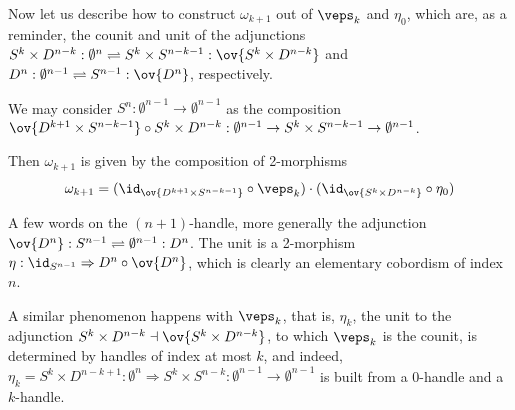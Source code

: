 \documentclass[12pt]{article}
\newcommand{\disk}[1]{{D^{#1}}}
\newcommand{\sphr}[1]{{S^{#1}}}
\newcommand{\empt}[1]{{\emptyset^{#1}}}
\begin{document}
Now let us describe how to construct $\omega_{k+1}$
out of $\veps_k$ and $\eta_0$,
which are, as a reminder,
the counit and unit of the adjunctions
$\sphr{k} \times \disk{n-k} : \empt{n} \rightleftharpoons
	\sphr{k} \times \sphr{n-k-1} : \ov{\sphr{k} \times \disk{n-k}}$
and
$\disk{n} : \empt{n-1} \rightleftharpoons
	\sphr{n-1}: \ov{\disk{n}}$,
respectively.

We may consider $\sphr{n}: \empt{n-1} \to \empt{n-1}$
as the composition $\ov{\disk{k+1} \times \sphr{n-k-1}}
\circ \sphr{k} \times \disk{n-k} :
\empt{n-1} \to \sphr{k} \times \sphr{n-k-1} \to \empt{n-1}$.

Then $\omega_{k+1}$ is given by the composition of 2-morphisms
\[
\omega_{k+1} = (\id_{\ov{\disk{k+1} \times \sphr{n-k-1}}}
		\circ \veps_k)
	\cdot (\id_{\ov{\sphr{k} \times \disk{n-k}}} \circ \eta_0)
\]



A few words on the $(n+1)$-handle,
more generally the adjunction
$\ov{\disk{n}} : \sphr{n-1} \rightleftharpoons
	\empt{n-1}: \disk{n}$.
The unit is a 2-morphism
$\eta: \id_{\sphr{n-1}} \Rightarrow \disk{n} \circ \ov{\disk{n}}$,
which is clearly an elementary cobordism of index $n$.

A similar phenomenon happens with $\veps_k$,
that is, $\eta_k$, the unit to the adjunction
$\sphr{k} \times \disk{n-k} \dashv
	\ov{\sphr{k} \times \disk{n-k}}$,
to which $\veps_k$ is the counit,
is determined by handles of index at most $k$,
and indeed,
$\eta_k = \sphr{k} \times \disk{n-k+1}:
\empt{n} \Rightarrow \sphr{k} \times \sphr{n-k}:
\empt{n-1} \to \empt{n-1}$
is built from a 0-handle and a $k$-handle.
\end{document}
